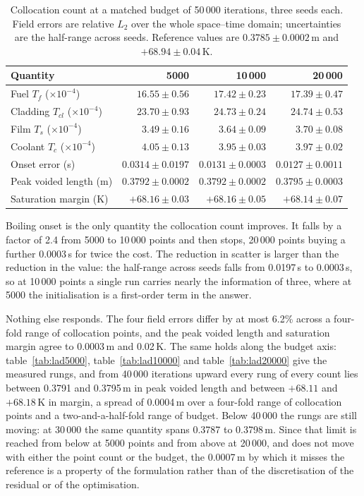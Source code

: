 \documentclass[11pt,a4paper]{article}
\begin{document}
\begin{table}[tbp]
\caption{Collocation count at a matched budget of 50\,000 iterations, three seeds each.
Field errors are relative $L_2$ over the whole space--time domain; uncertainties are the
half-range across seeds. Reference values are $0.3785 \pm 0.0002$\,m and
$+68.94 \pm 0.04$\,K.}
\label{tab:colloc}
\centering
\begin{tabular}{@{}lrrr@{}}
\toprule
Quantity & 5000 & 10\,000 & 20\,000 \\
\midrule
Fuel $T_f$ ($\times10^{-4}$)     & $16.55 \pm 0.56$ & $17.42 \pm 0.23$ & $17.39 \pm 0.47$ \\
Cladding $T_{cl}$ ($\times10^{-4}$) & $23.70 \pm 0.93$ & $24.73 \pm 0.24$ & $24.74 \pm 0.53$ \\
Film $T_s$ ($\times10^{-4}$)     & $3.49 \pm 0.16$  & $3.64 \pm 0.09$  & $3.70 \pm 0.08$ \\
Coolant $T_c$ ($\times10^{-4}$)  & $4.05 \pm 0.13$  & $3.95 \pm 0.03$  & $3.97 \pm 0.02$ \\
Onset error (s)                  & $0.0314 \pm 0.0197$ & $0.0131 \pm 0.0003$ & $0.0127 \pm 0.0011$ \\
Peak voided length (m)           & $0.3792 \pm 0.0002$ & $0.3792 \pm 0.0002$ & $0.3795 \pm 0.0003$ \\
Saturation margin (K)            & $+68.16 \pm 0.03$ & $+68.16 \pm 0.05$ & $+68.14 \pm 0.07$ \\
\bottomrule
\end{tabular}
\end{table}

Boiling onset is the only quantity the collocation count improves. It falls by a factor of
2.4 from 5000 to 10\,000 points and then stops, 20\,000 points buying a further 0.0003\,s
for twice the cost. The reduction in scatter is larger than the reduction in the value: the
half-range across seeds falls from 0.0197\,s to 0.0003\,s, so at 10\,000 points a single
run carries nearly the information of three, where at 5000 the initialisation is a
first-order term in the answer.

Nothing else responds. The four field errors differ by at most 6.2\% across a four-fold
range of collocation points, and the peak voided length and saturation margin agree to
0.0003\,m and 0.02\,K. The same holds along the budget axis: table~\ref{tab:lad5000},
table~\ref{tab:lad10000} and table~\ref{tab:lad20000} give the measured rungs, and from
40\,000 iterations upward every rung of every
count lies between 0.3791 and 0.3795\,m in peak voided length and between $+68.11$ and
$+68.18$\,K in margin, a spread of 0.0004\,m over a four-fold range of collocation points
and a two-and-a-half-fold range of budget. Below 40\,000 the rungs are still moving: at
30\,000 the same quantity spans 0.3787 to 0.3798\,m. Since that limit is reached from below at 5000 points and from
above at 20\,000, and does not move with either the point count or the budget, the
0.0007\,m by which it misses the reference is a property of the formulation rather than of
the discretisation of the residual or of the optimisation.
\end{document}
